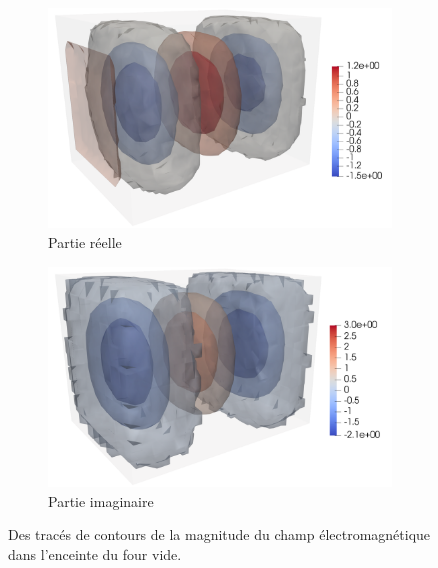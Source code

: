 \begin{figure}[H]
    \centering
    \begin{subfigure}{.5\textwidth}
        \centering
        \includegraphics[scale=0.15]{figures/helmholtz/helmholtz_reel_vide2.png}
        \caption{Partie réelle}
    \end{subfigure}%
    \begin{subfigure}{.5\textwidth}
        \centering
        \includegraphics[scale=0.15]{figures/helmholtz/helmholtz_imag_vide2.png}
        \caption{Partie imaginaire}
    \end{subfigure}
    \caption{Des tracés de contours de la magnitude du champ électromagnétique
    dans l'enceinte du four vide.}
\end{figure}


